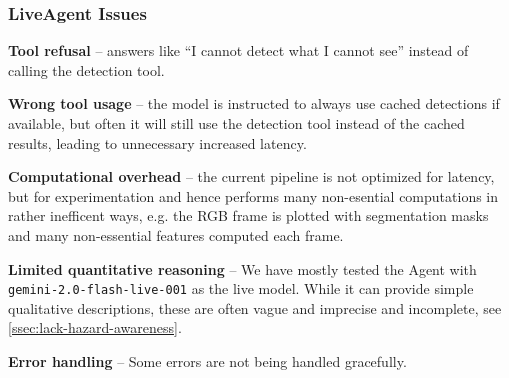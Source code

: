 \subsubsection{LiveAgent Issues}
\begin{description}
    \item \textbf{Tool refusal} -- answers like ``I cannot detect what I cannot see'' instead of calling the detection tool.
    \item \textbf{Wrong tool usage} -- the model is instructed to always use cached detections if available, but often it will still use the detection tool instead of the cached results, leading to unnecessary increased latency.
    \item \textbf{Computational overhead} -- the current pipeline is not optimized for latency, but for experimentation and hence performs many non-esential computations in rather inefficent ways, e.g. the RGB frame is plotted with segmentation masks and many non-essential features computed each frame.
    \item \textbf{Limited quantitative reasoning} -- We have mostly tested the Agent with \texttt{gemini-2.0-flash-live-001} as the live model. While it can provide simple qualitative descriptions, these are often vague and imprecise and incomplete, see \autoref{ssec:lack-hazard-awareness}.
    \item \textbf{Error handling} -- Some errors are not being handled gracefully.
\end{description}

